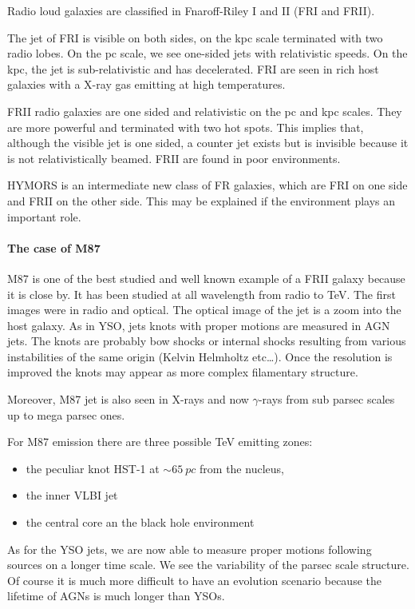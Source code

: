 \documentclass[10pt,a4paper,english]{article}
\begin{document}
Radio loud galaxies are classified in Fnaroff-Riley I and II (FRI and FRII).

The jet of FRI is visible on both sides, on the kpc scale terminated with two
radio lobes. On the pc scale, we see one-sided jets with relativistic speeds.
On the kpc, the jet is sub-relativistic and has decelerated. FRI are seen in
rich host galaxies with a X-ray gas emitting at high temperatures.

FRII radio galaxies are one sided and relativistic on the pc and kpc scales.
They are more powerful and terminated with two hot spots. This implies that,
although the visible jet is one sided, a counter jet exists but is invisible
because it is not relativistically beamed. FRII are found in poor environments.

HYMORS is an intermediate new class of FR galaxies, which are FRI on one side
and FRII on the other side. This may be explained if the environment plays an
important role.

\paragraph{The case of M87}

M87 is one of the best studied and well known example of a FRII galaxy because
it is close by. It has been studied at all wavelength from radio to \si{TeV}.
The first images were in radio and optical. The optical image of the jet is a
zoom into the host galaxy. As in YSO, jets knots with proper motions are
measured in AGN jets. The knots are probably bow shocks or internal shocks
resulting from various instabilities of the same origin (Kelvin Helmholtz
etc…). Once the resolution is improved the knots may appear as more complex
filamentary structure.

Moreover, M87 jet is also seen in X-rays and now $\gamma$-rays from sub parsec
scales up to mega parsec ones.


For M87 emission there are three possible \si{TeV} emitting zones:
\begin{itemize}
    \item the peculiar knot HST-1 at $\sim \SI{65}{pc}$ from the nucleus,
    \item the inner VLBI jet
    \item the central core an the black hole environment
\end{itemize}

As for the YSO jets, we are now able to measure proper motions following
sources on a longer time scale. We see the variability of the parsec scale
structure. Of course it is much more difficult to have an evolution scenario
because the lifetime of AGNs is much longer than YSOs.
\end{document}
